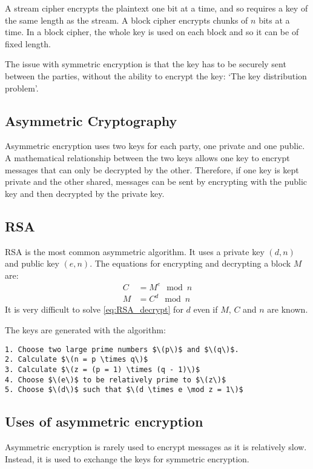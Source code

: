 A stream cipher encrypts the plaintext one bit at a time, and so requires a key of the same length as the stream. A block cipher encrypts chunks of \(n\) bits at a time. In a block cipher, the whole key is used on each block and so it can be of fixed length.

The issue with symmetric encryption is that the key has to be securely sent between the parties, without the ability to encrypt the key: `The key distribution problem'.

\subsection{Asymmetric Cryptography}
Asymmetric encryption uses two keys for each party, one private and one public. A mathematical relationship between the two keys allows one key to encrypt messages that can only be decrypted by the other. Therefore, if one key is kept private and the other shared, messages can be sent by encrypting with the public key and then decrypted by the private key.

\subsection{RSA}
RSA is the most common asymmetric algorithm. It uses a private key \((d, n)\) and public key \((e, n)\). The equations for encrypting and decrypting a block \(M\) are:
\begin{align}
    C & = M^e \mod n \label{eq:RSA_encrypt} \\
    M & = C^d \mod n \label{eq:RSA_decrypt}
\end{align}
It is very difficult to solve \cref{eq:RSA_decrypt} for \(d\) even if \(M\), \(C\) and \(n\) are known.

The keys are generated with the algorithm:
\begin{lstlisting}
1. Choose two large prime numbers $\(p\)$ and $\(q\)$.
2. Calculate $\(n = p \times q\)$
3. Calculate $\(z = (p = 1) \times (q - 1)\)$
4. Choose $\(e\)$ to be relatively prime to $\(z\)$
5. Choose $\(d\)$ such that $\(d \times e \mod z = 1\)$
\end{lstlisting}

\subsection{Uses of asymmetric encryption}
Asymmetric encryption is rarely used to encrypt messages as it is relatively slow. Instead, it is used to exchange the keys for symmetric encryption.

